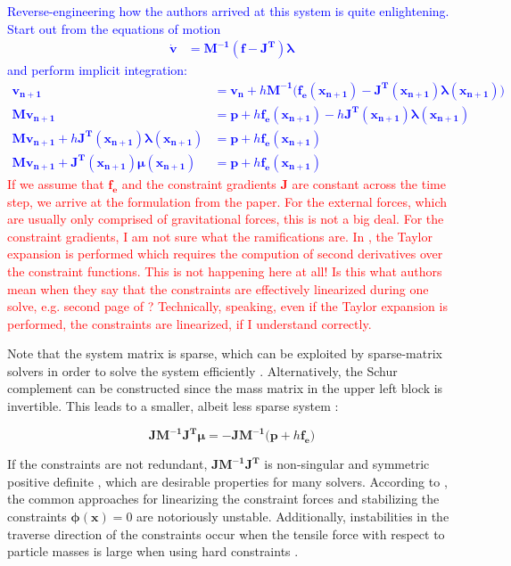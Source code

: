 \documentclass{article}
\begin{document}
\textcolor{blue}{Reverse-engineering how the authors arrived at this system is quite enlightening. Start out from the equations of motion 
\cite{ascher1995}
    \begin{align*}
        \dot{\bm{v}} &= \bm{M^{-1}(f - J^T) \lambda}
    \end{align*}
    and perform implicit integration:
    \begin{align*}
        \bm{v_{n+1}} &= \bm{v_n} + h\bm{M^{-1}(f_e(x_{n+1})} - \bm{J^T(x_{n+1})\lambda(x_{n+1}))} \\
        \bm{Mv_{n+1}} &= \bm{p} + h\bm{f_e(x_{n+1})} - h\bm{J^T(x_{n+1})\lambda(x_{n+1})} \\ 
        \bm{Mv_{n+1}} + h\bm{J^T(x_{n+1})\lambda(x_{n+1})} &= \bm{p} + h\bm{f_e(x_{n+1})} \\ 
        \bm{Mv_{n+1}} + \bm{J^T(x_{n+1}) \mu(x_{n+1})} &= \bm{p} + h\bm{f_e(x_{n+1})}
    \end{align*}
}
\textcolor{red}{If we assume that $\bm{f_e}$ and the constraint gradients $\bm{J}$ are constant across the time step, we arrive at the 
formulation from the paper. For the external forces, which are usually only comprised of gravitational forces, this is not a big 
deal. For the constraint gradients, I am not sure what the ramifications are. In \cite{baraff1998}, the Taylor expansion is performed
which requires the compution of second derivatives over the constraint functions. This is not happening here at all! Is this what 
authors mean when they say that the constraints are effectively linearized during one solve, e.g. second page 
of \cite{mueller2020}? Technically, speaking, even if the Taylor expansion is performed, the constraints are linearized, if I 
understand correctly.}

Note that the system matrix is sparse, which can be exploited by sparse-matrix solvers in order to solve the system efficiently
\cite{baraff1996}. Alternatively, the Schur complement can be constructed since the mass matrix in the upper left block is invertible.
This leads to a smaller, albeit less sparse system \cite{tournier2015}:

\[
    \bm{JM^{-1}J^T \mu} = \bm{-JM^{-1}(p + } h \bm{f_e)}
\]

If the constraints are not redundant, $\bm{JM^{-1}J^T}$ is non-singular and symmetric positive definite \cite{baraff1996}, which are desirable
properties for many solvers. According to \cite{servin2006}, the common approaches for linearizing the constraint forces and stabilizing the constraints 
$\bm{\phi(x)} = 0$ are notoriously unstable. Additionally, instabilities in the traverse direction of the constraints occur when the tensile force with 
respect to particle masses is large when using hard constraints \cite{tournier2015}.
\end{document}
